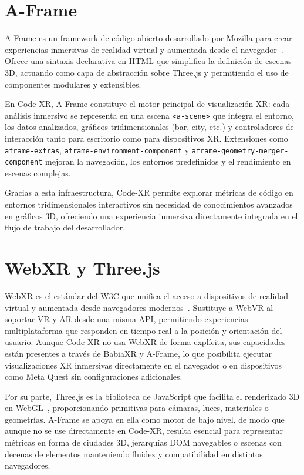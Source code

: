 \documentclass[a4paper, 12pt]{book}
\begin{document}
\section{A-Frame}
\label{sec:aframe}

A-Frame es un framework de código abierto desarrollado por Mozilla para crear experiencias inmersivas de realidad virtual y aumentada desde el navegador~\cite{aframe}. Ofrece una sintaxis declarativa en HTML que simplifica la definición de escenas 3D, actuando como capa de abstracción sobre Three.js y permitiendo el uso de componentes modulares y extensibles.  

En Code-XR, A-Frame constituye el motor principal de visualización XR: cada análisis inmersivo se representa en una escena \texttt{<a-scene>} que integra el entorno, los datos analizados, gráficos tridimensionales (bar, city, etc.) y controladores de interacción tanto para escritorio como para dispositivos XR. Extensiones como \texttt{aframe-extras}, \texttt{aframe-environment-component} y \texttt{aframe-geometry-merger-component} mejoran la navegación, los entornos predefinidos y el rendimiento en escenas complejas.  

Gracias a esta infraestructura, Code-XR permite explorar métricas de código en entornos tridimensionales interactivos sin necesidad de conocimientos avanzados en gráficos 3D, ofreciendo una experiencia inmersiva directamente integrada en el flujo de trabajo del desarrollador.

\section{WebXR y Three.js}
\label{sec:webxr-threejs}

WebXR es el estándar del W3C que unifica el acceso a dispositivos de realidad virtual y aumentada desde navegadores modernos~\cite{webxr}. Sustituye a WebVR al soportar VR y AR desde una misma API, permitiendo experiencias multiplataforma que responden en tiempo real a la posición y orientación del usuario. Aunque Code-XR no usa WebXR de forma explícita, sus capacidades están presentes a través de BabiaXR y A-Frame, lo que posibilita ejecutar visualizaciones XR inmersivas directamente en el navegador o en dispositivos como Meta Quest sin configuraciones adicionales.  

Por su parte, Three.js es la biblioteca de JavaScript que facilita el renderizado 3D en WebGL~\cite{threejs}, proporcionando primitivas para cámaras, luces, materiales o geometrías. A-Frame se apoya en ella como motor de bajo nivel, de modo que aunque no se use directamente en Code-XR, resulta esencial para representar métricas en forma de ciudades 3D, jerarquías DOM navegables o escenas con decenas de elementos manteniendo fluidez y compatibilidad en distintos navegadores.  
\end{document}
